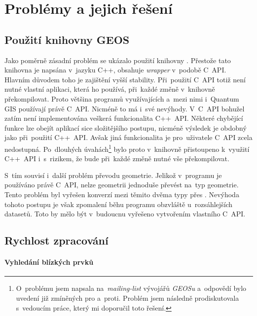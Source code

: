 \chapter{Problémy a jejich řešení}
\label{7-problemy}

\section{Použití knihovny GEOS}
\label{problemy-geos}
Jako poměrně zásadní problém se ukázalo použití knihovny . 
Přestože tato knihovna je napsána v~jazyku C++, obsahuje \textit{wrapper} 
v~podobě C~API. Hlavním důvodem toho je zajištění vyšší 
stability. Při~použití C~API totiž není nutné vlastní aplikaci,
která ho používá, při~každé změně v~knihovně  překompilovat. 
Proto většina programů využívajících  a~mezi nimi i~Quantum 
GIS používají právě C~API. Nicméně to má i~své nevýhody. V~C~API bohužel 
zatím není implementována veškerá funkcionalita C++~API. Některé chybějící 
funkce lze obejít aplikací sice složitějšího postupu, nicméně výsledek je 
obdobný jako při~použití C++~API. Avšak jiná funkcionalita je pro~uživatele 
C~API zcela nedostupná. Po~dlouhých úvahách\footnote{O~problému jsem napsala
na~\textit{mailing-list} vývojářů \textit{GEOSu} a~odpovědí bylo uvedení 
již zmíněných pro a~proti. Problém jsem následně prodiskutovala s~vedoucím 
práce, který mi doporučil toto řešení.} bylo proto v~knihovně  
přistoupeno k~využití C++~API i~s~rizikem, že bude při~každé změně nutné 
vše překompilovat. 

S~tím souvisí i~další problém převodu geometrie. Jelikož v~programu  
je používáno právě C~API, nelze  geometrii jednoduše převést na~typ 
 geometrie. Tento problém byl vyřešen konverzí mezi těmito dvěma
typy přes . Nevýhoda tohoto postupu je však zpomalení běhu programu 
obzvláště u~rozsáhlejších datasetů. Toto by mělo být v~budoucnu vyřešeno 
vytvořením vlastního C~API.


\section{Rychlost zpracování}
\label{problemy-rychlost}

\subsubsection{Vyhledání blízkých prvků}

